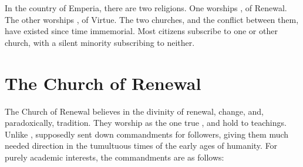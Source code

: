 \documentclass[blue]{Emperia}
\begin{document}
\name{\bNeutralReligion{}}


In the country of Emperia, there are two religions. One worships \cGaladin{}, \cGaladin{\God} of Renewal. The other worships \cElph{}, \cElph{\God} of Virtue. The two churches, and the conflict between them, have existed since time immemorial. Most citizens subscribe to one or other church, with a silent minority subscribing to neither. 

\section{The Church of Renewal}
The Church of Renewal believes in the divinity of renewal, change, and, paradoxically, tradition. They worship \CGaladin{} as the one true \cGaladin{\God}, and hold to \CGaladin{\their} teachings. Unlike \cElph{}, \cGaladin{} supposedly sent down commandments for \CGaladin{\their} followers, giving them much needed direction in the tumultuous times of the early ages of humanity. For purely academic interests, the commandments are as follows: 
\end{document}
